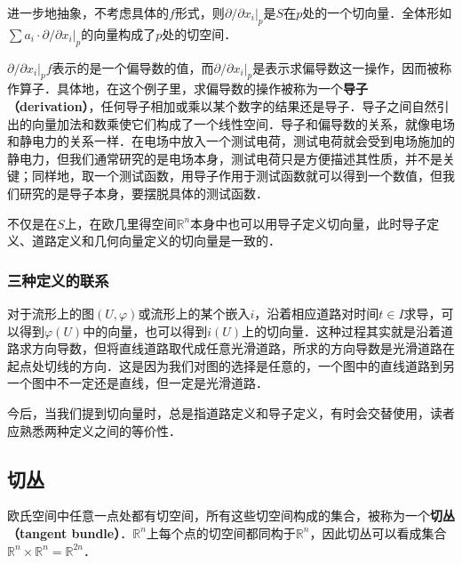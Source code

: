 进一步地抽象，不考虑具体的$f$形式，则$\partial/\partial x_i|_{p}$是$S$在$p$处的一个切向量．全体形如$\sum a_i\cdot\partial/\partial x_i|_{p}$的向量构成了$p$处的切空间．

$\partial/\partial x_i|_{p}f$表示的是一个偏导数的值，而$\partial/\partial x_i|_{p}$是表示求偏导数这一操作，因而被称作算子．具体地，在这个例子里，求偏导数的操作被称为一个\textbf{导子（derivation）}，任何导子相加或乘以某个数字的结果还是导子．导子之间自然引出的向量加法和数乘使它们构成了一个线性空间．导子和偏导数的关系，就像电场和静电力的关系一样．在电场中放入一个测试电荷，测试电荷就会受到电场施加的静电力，但我们通常研究的是电场本身，测试电荷只是方便描述其性质，并不是关键；同样地，取一个测试函数，用导子作用于测试函数就可以得到一个数值，但我们研究的是导子本身，要摆脱具体的测试函数．

不仅是在$S$上，在欧几里得空间$\mathbb{R}^n$本身中也可以用导子定义切向量，此时导子定义、道路定义和几何向量定义的切向量是一致的．

\subsubsection{三种定义的联系}

对于流形上的图$(U,\varphi)$或流形上的某个嵌入$i$，沿着相应道路对时间$t\in I$求导，可以得到$\varphi(U)$中的向量，也可以得到$i(U)$上的切向量．这种过程其实就是沿着道路求方向导数，但将直线道路取代成任意光滑道路，所求的方向导数是光滑道路在起点处切线的方向．这是因为我们对图的选择是任意的，一个图中的直线道路到另一个图中不一定还是直线，但一定是光滑道路．

今后，当我们提到切向量时，总是指道路定义和导子定义，有时会交替使用，读者应熟悉两种定义之间的等价性．

\subsection{切丛}

欧氏空间中任意一点处都有切空间，所有这些切空间构成的集合，被称为一个\textbf{切丛（tangent bundle）}．$\mathbb{R}^n$上每个点的切空间都同构于$\mathbb{R}^n$，因此切丛可以看成集合$\mathbb{R}^n\times\mathbb{R}^n=\mathbb{R}^{2n}$．







